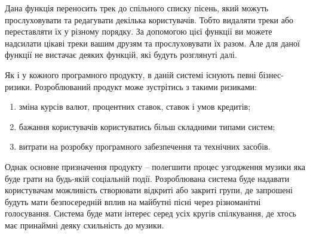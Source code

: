 \begin{enumerate}[label=\alph*)]
            Дана функція переносить трек до спільного списку пісень, який можуть прослуховувати та редагувати декілька користувачів. Тобто видаляти треки або переставляти їх у різному порядку. За допомогою цієї функції ви можете надсилати цікаві треки вашим друзям та прослуховувати їх разом. Але для даної функції не вистачає деяких функцій, які будуть розглянуті далі.

            Як і у кожного програмного продукту, в даній системі існують певні бізнес-ризики. Розроблюваний продукт може зустрітись з такими ризиками:

            \begin{enumerate}[label=\arabic*)]
                \item зміна курсів валют, процентних ставок, ставок і умов кредитів;
                \item бажання користувачів користуватись більш складними типами систем;
                \item витрати на розробку програмного забезпечення та технічних засобів.
            \end{enumerate}

            Однак основне призначення продукту – полегшити процес узгодження музики яка буде грати на будь-якій соціальній події. Розроблювана система буде надавати користувачам можливість створювати відкриті або закриті групи, де запрошені будуть мати безпосередній вплив на майбутні пісні через різноманітні голосування. Система буде мати інтерес серед усіх кругів спілкування, де хтось має принаймні деяку схильність до музики.

    \end{enumerate}
    \newpage
